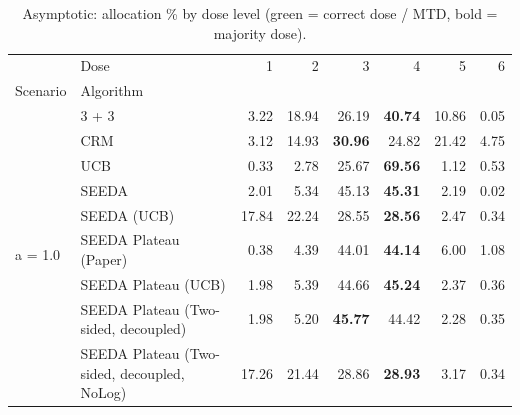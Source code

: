 \begin{table}[H]
\centering
\caption{Asymptotic: allocation \% by dose level (green = correct dose / MTD, bold = majority dose).}
\label{tab:asym_alloc_by_dose}
\begin{tabular}{llrrrrrr}
\toprule
 & Dose & 1 & 2 & 3 & 4 & 5 & 6 \\
Scenario & Algorithm &  &  &  &  &  &  \\
\midrule
\multirow[c]{9}{*}{a = 1.0} & 3 + 3 & 3.22 & 18.94 & {\cellcolor[HTML]{C8E6C9}} 26.19 & \bfseries 40.74 & 10.86 & 0.05 \\
 & CRM & 3.12 & 14.93 & {\cellcolor[HTML]{C8E6C9}} \bfseries 30.96 & 24.82 & 21.42 & 4.75 \\
 & UCB & 0.33 & 2.78 & {\cellcolor[HTML]{C8E6C9}} 25.67 & \bfseries 69.56 & 1.12 & 0.53 \\
 & SEEDA & 2.01 & 5.34 & {\cellcolor[HTML]{C8E6C9}} 45.13 & \bfseries 45.31 & 2.19 & 0.02 \\
 & SEEDA (UCB) & 17.84 & 22.24 & {\cellcolor[HTML]{C8E6C9}} 28.55 & \bfseries 28.56 & 2.47 & 0.34 \\
 & SEEDA Plateau (Paper) & 0.38 & 4.39 & {\cellcolor[HTML]{C8E6C9}} 44.01 & \bfseries 44.14 & 6.00 & 1.08 \\
 & SEEDA Plateau (UCB) & 1.98 & 5.39 & {\cellcolor[HTML]{C8E6C9}} 44.66 & \bfseries 45.24 & 2.37 & 0.36 \\
 & SEEDA Plateau (Two-sided, decoupled) & 1.98 & 5.20 & {\cellcolor[HTML]{C8E6C9}} \bfseries 45.77 & 44.42 & 2.28 & 0.35 \\
 & SEEDA Plateau (Two-sided, decoupled, NoLog) & 17.26 & 21.44 & {\cellcolor[HTML]{C8E6C9}} 28.86 & \bfseries 28.93 & 3.17 & 0.34 \\
\bottomrule
\end{tabular}
\end{table}
